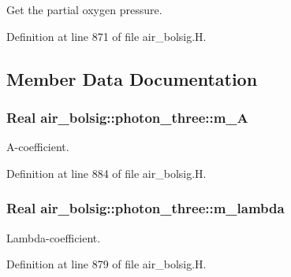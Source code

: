 Get the partial oxygen pressure. 



Definition at line 871 of file air\+\_\+bolsig.\+H.



\subsection{Member Data Documentation}
\subsubsection[{\texorpdfstring{m\+\_\+A}{m_A}}]{\setlength{\rightskip}{0pt plus 5cm}Real air\+\_\+bolsig\+::photon\+\_\+three\+::m\+\_\+A\hspace{0.3cm}{\ttfamily [protected]}}\hypertarget{classair__bolsig_1_1photon__three_ac9caccc3e87b411aa740bc8419dacfae}{}\label{classair__bolsig_1_1photon__three_ac9caccc3e87b411aa740bc8419dacfae}


A-\/coefficient. 



Definition at line 884 of file air\+\_\+bolsig.\+H.

\subsubsection[{\texorpdfstring{m\+\_\+lambda}{m_lambda}}]{\setlength{\rightskip}{0pt plus 5cm}Real air\+\_\+bolsig\+::photon\+\_\+three\+::m\+\_\+lambda\hspace{0.3cm}{\ttfamily [protected]}}\hypertarget{classair__bolsig_1_1photon__three_afaa92900bec8b857b48e7fe855f0c1e4}{}\label{classair__bolsig_1_1photon__three_afaa92900bec8b857b48e7fe855f0c1e4}


Lambda-\/coefficient. 



Definition at line 879 of file air\+\_\+bolsig.\+H.

